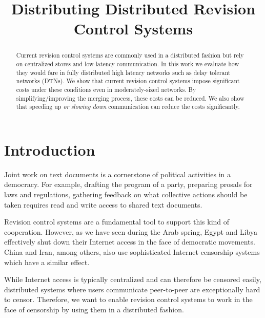 \documentclass[letterpaper,conference]{IEEEtran}
\begin{document}
\title{Distributing Distributed Revision Control Systems}

\author{
\and
{}
}
\maketitle


\begin{abstract}
\boldmath Current revision control systems are commonly used in a distributed fashion but rely on centralized stores and low-latency communication. In this work we evaluate how they would fare in fully distributed high latency networks such as delay tolerant networks (DTNs). We show that current revision control systems impose significant costs under these conditions even in moderately-sized networks. By simplifying/improving the merging process, these costs can be reduced.
We also show that speeding up \textit{or slowing down} communication can reduce the costs significantly.
\end{abstract}

\IEEEpeerreviewmaketitle

\section{Introduction}

Joint work on text documents is a cornerstone of political activities in a democracy. For example, drafting the program of a party, preparing prosals for laws and regulations, gathering feedback on what collective actions should be taken requires read and write access to shared text documents.

Revision control systems are a fundamental tool to support this kind of cooperation. However, as we have seen during the Arab spring, Egypt and Libya effectively shut down their Internet access\cite{outage} in the face of democratic movements. China and Iran, among others, also use sophisticated Internet censorship systems which have a similar effect.

While Internet access is typically centralized and can therefore be censored easily, distributed systems where users communicate peer-to-peer are exceptionally hard to censor. Therefore, we want to enable revision control systems to work in the face of censorship by using them in a distributed fashion.
\end{document}
